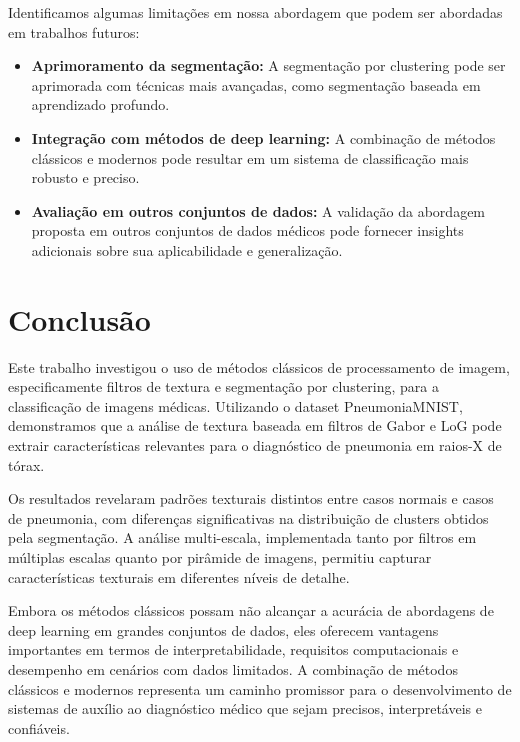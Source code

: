 \documentclass[sigconf,nonacm]{acmart}
\begin{document}
Identificamos algumas limitações em nossa abordagem que podem ser abordadas em trabalhos futuros:
\begin{itemize}
  \item \textbf{Aprimoramento da segmentação:} A segmentação por clustering pode ser aprimorada com técnicas mais avançadas, como segmentação baseada em aprendizado profundo.
  \item \textbf{Integração com métodos de deep learning:} A combinação de métodos clássicos e modernos pode resultar em um sistema de classificação mais robusto e preciso.
  \item \textbf{Avaliação em outros conjuntos de dados:} A validação da abordagem proposta em outros conjuntos de dados médicos pode fornecer insights adicionais sobre sua aplicabilidade e generalização.
\end{itemize}

\section{Conclusão}

Este trabalho investigou o uso de métodos clássicos de processamento de imagem, especificamente filtros de textura e segmentação por clustering, para a classificação de imagens médicas. Utilizando o dataset PneumoniaMNIST, demonstramos que a análise de textura baseada em filtros de Gabor e LoG pode extrair características relevantes para o diagnóstico de pneumonia em raios-X de tórax.

Os resultados revelaram padrões texturais distintos entre casos normais e casos de pneumonia, com diferenças significativas na distribuição de clusters obtidos pela segmentação. A análise multi-escala, implementada tanto por filtros em múltiplas escalas quanto por pirâmide de imagens, permitiu capturar características texturais em diferentes níveis de detalhe.

Embora os métodos clássicos possam não alcançar a acurácia de abordagens de deep learning em grandes conjuntos de dados, eles oferecem vantagens importantes em termos de interpretabilidade, requisitos computacionais e desempenho em cenários com dados limitados. A combinação de métodos clássicos e modernos representa um caminho promissor para o desenvolvimento de sistemas de auxílio ao diagnóstico médico que sejam precisos, interpretáveis e confiáveis.

\balance


\end{document}
